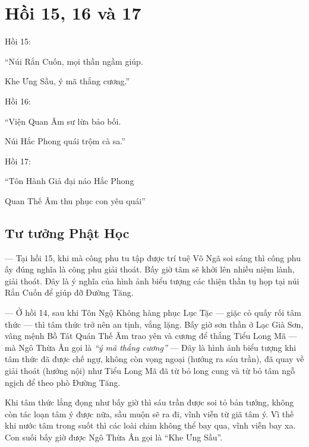 \chapter{Hồi 15, 16 và 17} %
\label{cha:hoi_15_16_17}

Hồi 15:

\begin{itshape}
``Núi Rắn Cuốn, mọi thần ngầm giúp.

Khe Ưng Sầu, ý mã thắng cương.''
\end{itshape}

Hồi 16:

\begin{itshape}
``Viện Quan Âm sư lừa bảo bối.

Núi Hắc Phong quái trộm cà sa.''
\end{itshape}

Hồi 17:

\begin{itshape}
``Tôn Hành Giả đại náo Hắc Phong

Quan Thế Âm thu phục con yêu quái''
\end{itshape}

\section{Tư tưởng Phật Học} %
\label{sec:15_phat_hoc}

--- Tại hồi 15, khi mà công phu tu tập được trí tuệ Vô Ngã soi sáng thì công phu ấy đúng nghĩa là công phu giải thoát. Bấy giờ tâm sẽ khởi lên nhiều niệm lành, giải thoát. Đây là ý nghĩa của hình ảnh biểu tượng các thiện thần tụ họp tại núi Rắn Cuốn để giúp đỡ Đường Tăng.

--- Ở hồi 14, sau khi Tôn Ngộ Không hàng phục Lục Tặc --- giặc cỏ quấy rối tâm thức --- thì tâm thức trở nên an tịnh, vắng lặng. Bấy giờ sơn thần ở Lạc Già Sơn, vâng mệnh Bồ Tát Quán Thế Âm trao yên và cương để thắng Tiểu Long Mã --- mà Ngô Thừa Ân gọi là \emph{``ý mã thắng cương''} --- Đây là hình ảnh biểu tượng khi tâm thức đã được chế ngự, không còn vọng ngoại (hướng ra sáu trần), đã quay về giải thoát (hướng nội) như Tiểu Long Mã đã từ bỏ long cung và từ bỏ tâm ngỗ ngịch để theo phò Đường Tăng.

Khi tâm thức lắng đọng như bấy giờ thì sáu trần được soi tỏ bản tướng, không còn tác loạn tâm ý được nữa, sầu muộn sẽ ra đi, vĩnh viễn từ giã tâm ý. Vì thế khi nước tâm trong suốt thì các loài chim không thể bay qua, vĩnh viễn bay xa. Con suối bấy giờ được Ngô Thừa Ân gọi là ``Khe Ưng Sầu''.

